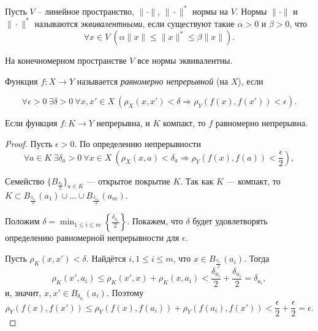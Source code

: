 \begin{definition}
    Пусть $V$ -- линейное пространство, $\|\cdot\|$, $\|\cdot\|^{*}$ нормы на $V$. Нормы $\|\cdot\|$ и $\|\cdot\|^{*}$ называются \textit{эквивалентными}, если существуют такие $\alpha > 0$ и $\beta > 0$, что
    \[\forall x \in V \ \left(\alpha\|x\| \leq \|x\|^{*} \leq \beta \|x\|\right).\]
\end{definition}

\begin{corollary}
    На конечномерном пространстве $V$ все нормы эквивалентны.
\end{corollary}

\begin{definition}
    Функция $f: X \to Y$ называется \textit{равномерно непрерывной} (на $X$), если

    \[\forall \epsilon > 0 \ \exists \delta > 0 \ \forall x, x' \in X \ (\rho_{X}(x, x') < \delta \Rightarrow \rho_{Y}(f(x), f(x')) < \epsilon).\]
\end{definition}

\begin{theorem}[Кантор]
    Если функция $f: K \to Y$ непрерывна, и $K$ компакт, то $f$ равномерно непрерывна.
\end{theorem}

\begin{proof}
    Пусть $\epsilon > 0$. По определению непрерывности
    \[
        \forall a \in K \ \exists \delta_a > 0 \ \forall x \in X \ \left(\rho_X(x, a) < \delta_a \Rightarrow \rho_Y(f(x), f(a)) < \frac{\epsilon}{2}\right),
    \]

    Семейство $\{B_{\frac{\delta_a}{2}}\}_{a \in K}$ --- открытое покрытие $K$. Так как $K$ --- компакт, то $K \subset B_{\frac{\delta_{a_1}}{2}}(a_1) \cup \ldots \cup B_{\frac{\delta_{a_m}}{2}}(a_m)$.

    Положим $\delta = \min_{1 \le i \le m} \left\{\frac{\delta_{a_i}}{2}\right\}$. Покажем, что $\delta$ будет удовлетворять определению равномерной непрерывности для $\epsilon$.

    Пусть $\rho_K(x, x') < \delta$. Найдётся $i, 1 \le i \le m$, что $x \in B_{\frac{\delta_{a_i}}{2}}(a_i)$. Тогда
    \[
        \rho_K(x', a_i) \le \rho_K(x', x) + \rho_K(x, a_i) < \frac{\delta_{a_i}}{2} + \frac{\delta_{a_i}}{2} = \delta_{a_i},
    \]
    и, значит, $x, x' \in B_{\delta_{a_i}}(a_i)$. Поэтому
    \[
        \rho_Y(f(x), f(x')) \le \rho_Y(f(x), f(a_i)) + \rho_Y(f(a_i), f(x')) < \frac{\epsilon}{2} + \frac{\epsilon}{2} = \epsilon.
    \]
\end{proof}

